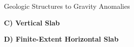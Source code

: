 \begin{activity}{Geologic Structures to Gravity Anomalies}








\bigskip\bigskip

\newpage
\begin{center}
\textbf{C) Vertical Slab}
\end{center}

\gax

\begin{center}
\end{center}

\bigskip\bigskip

\begin{center}
\textbf{D) Finite-Extent Horizontal Slab}
\end{center}


\end{activity}
